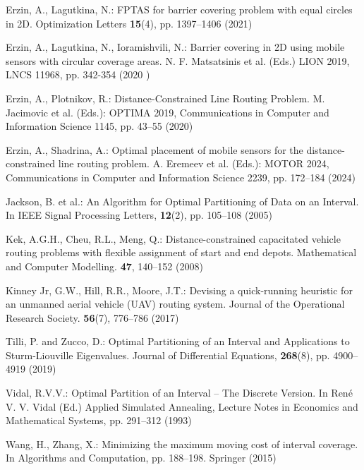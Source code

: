 \documentclass[runningheads]{llncs}
\begin{document}
\begin{thebibliography}{8}
 Erzin, A., Lagutkina, N.: FPTAS for barrier covering problem with equal circles in 2D. Optimization Letters \textbf{15}(4), pp. 1397--1406 (2021)

 Erzin, A., Lagutkina, N., Ioramishvili, N.: Barrier covering in 2D using mobile sensors with circular coverage areas. N. F. Matsatsinis et al. (Eds.) LION 2019, LNCS 11968, pp. 342-354 (2020 )

 Erzin, A., Plotnikov, R.: Distance-Constrained Line Routing Problem. M. Jacimovic et al. (Eds.): OPTIMA 2019, Communications in Computer and Information Science 1145, pp. 43--55 (2020)

 Erzin, A., Shadrina, A.: Optimal placement of mobile sensors for the distance-constrained line routing problem. A. Eremeev et al. (Eds.): MOTOR 2024, Communications in Computer and Information Science 2239, pp. 172--184 (2024)

 Jackson, B. et al.: An Algorithm for Optimal Partitioning of Data on an Interval. In IEEE Signal Processing Letters, \textbf{12}(2), pp. 105--108 (2005)

 Kek, A.G.H., Cheu, R.L., Meng, Q.: Distance-constrained capacitated vehicle routing problems with flexible assignment of start and end depots. Mathematical and Computer Modelling. \textbf{47}, 140--152 (2008)

 Kinney Jr, G.W., Hill, R.R., Moore, J.T.: Devising a quick-running heuristic for an unmanned aerial vehicle (UAV) routing system. Journal of the Operational Research Society. \textbf{56}(7), 776--786 (2017)

 Tilli, P. and Zucco, D.: Optimal Partitioning of an Interval and Applications to Sturm-Liouville Eigenvalues. Journal of Differential Equations, \textbf{268}(8), pp. 4900--4919 (2019)

 Vidal, R.V.V.: Optimal Partition of an Interval -- The Discrete Version. In Ren\'{e} V. V. Vidal (Ed.) Applied Simulated Annealing, Lecture Notes in Economics and Mathematical Systems, pp. 291--312 (1993)

 Wang, H., Zhang, X.: Minimizing the maximum moving cost of interval coverage. In Algorithms and Computation, pp. 188--198. Springer (2015)
\end{thebibliography}
\end{document}
